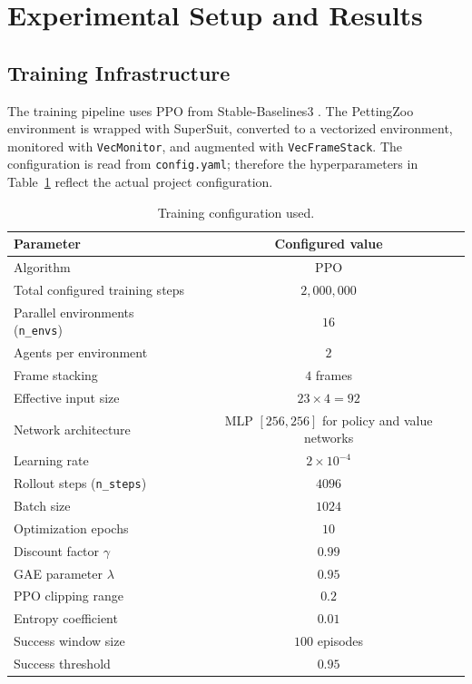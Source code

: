 \documentclass{article}
\begin{document}
\section{Experimental Setup and Results}

\subsection{Training Infrastructure}
The training pipeline uses PPO \cite{ppo} from Stable-Baselines3 \cite{sb3}. The PettingZoo environment \cite{pettingzoo} is wrapped with SuperSuit, converted to a vectorized environment, monitored with \texttt{VecMonitor}, and augmented with \texttt{VecFrameStack}. The configuration is read from \texttt{config.yaml}; therefore the hyperparameters in Table~\ref{tab:hparams} reflect the actual project configuration.

\begin{table}[htpb]
    \centering
    \renewcommand{\arraystretch}{1.2}
    \begin{tabular}{|l|c|}
        \hline
        \textbf{Parameter} & \textbf{Configured value} \\
        \hline
        Algorithm & PPO \\
        Total configured training steps & $2{,}000{,}000$ \\
        Parallel environments (\texttt{n\_envs}) & $16$ \\
        Agents per environment & $2$ \\
        Frame stacking & $4$ frames \\
        Effective input size & $23\times 4=92$ \\
        Network architecture & MLP $[256,256]$ for policy and value networks \\
        Learning rate & $2\times 10^{-4}$ \\
        Rollout steps (\texttt{n\_steps}) & $4096$ \\
        Batch size & $1024$ \\
        Optimization epochs & $10$ \\
        Discount factor $\gamma$ & $0.99$ \\
        GAE parameter $\lambda$ & $0.95$ \\
        PPO clipping range & $0.2$ \\
        Entropy coefficient & $0.01$ \\
        Success window size & $100$ episodes \\
        Success threshold & $0.95$ \\
        \hline
    \end{tabular}
    \caption{Training configuration used.}
    \label{tab:hparams}
\end{table}
\end{document}
